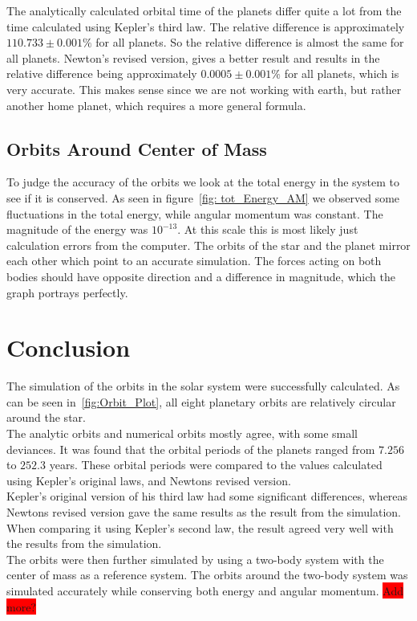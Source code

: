 \documentclass[reprint,english,notitlepage]{revtex4-2}
\begin{document}
The analytically calculated orbital time of the planets differ quite a lot from the time calculated using Kepler's third law.
The relative difference is approximately $110.733 \pm 0.001\%$ for all planets.
So the relative difference is almost the same for all planets.
Newton's revised version, gives a better result and results in the relative difference being approximately $0.0005 \pm 0.001\%$ for all planets, which is very accurate.
This makes sense since we are not working with earth, but rather another home planet, which requires a more general formula.

\subsection{Orbits Around Center of Mass}
	To judge the accuracy of the orbits we look at the total energy in the system to see if it is conserved.
	As seen in figure~\ref{fig: tot_Energy_AM} we observed some fluctuations in the total energy, while angular momentum was constant.
	The magnitude of the energy was $ 10^{-13} $.
	At this scale this is most likely just calculation errors from the computer.
	The orbits of the star and the planet mirror each other which point to an accurate simulation.
	The forces acting on both bodies should have opposite direction and a difference in magnitude, which the graph portrays perfectly.


\section{Conclusion}
The simulation of the orbits in the solar system were successfully calculated.
As can be seen in~\ref{fig:Orbit_Plot}, all eight planetary orbits are relatively circular around the star.\\
The analytic orbits and numerical orbits mostly agree, with some small deviances.
It was found that the orbital periods of the planets ranged from $7.256$ to $252.3$ years.
These orbital periods were compared to the values calculated using Kepler's original laws, and Newtons revised version.\\
Kepler's original version of his third law had some significant differences, whereas Newtons revised version gave the same results as the result from the simulation.
When comparing it using Kepler's second law, the result agreed very well with the results from the simulation.\\

The orbits were then further simulated by using a two-body system with the center of mass as a reference system.
The orbits around the two-body system was simulated accurately while conserving both energy and angular momentum.
\colorbox{red}{Add more?}
\end{document}
